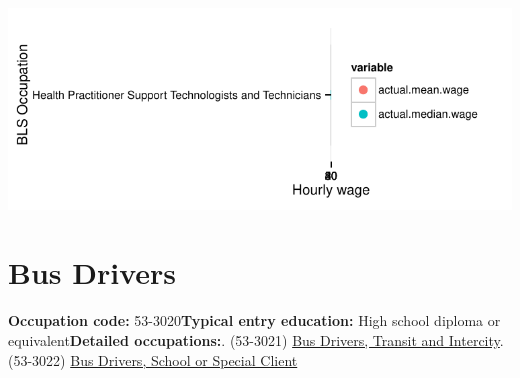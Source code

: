 \documentclass[a4paper,10pt]{article}\usepackage[]{graphicx}\usepackage[]{color}
\makeatletter
\def\maxwidth{ %
  \ifdim\Gin@nat@width>\linewidth
    \linewidth
  \else
    \Gin@nat@width
  \fi
}
\makeatother
\begin{document}
{\centering \includegraphics[width=\maxwidth]{figure/unnamed-chunk-243} 

}


\newpage\section{Bus Drivers}\textbf{Occupation code:} 53-3020\newline\textbf{Typical entry education:} High school diploma or equivalent\newline\textbf{Detailed occupations:}. (53-3021)  \href{http://www.bls.gov/oes/current/oes533021.htm}{Bus Drivers, Transit and Intercity}. (53-3022)  \href{http://www.bls.gov/oes/current/oes533022.htm}{Bus Drivers, School or Special Client}\newline%
\end{document}
